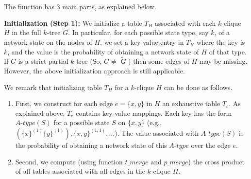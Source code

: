 The function has 3 main parts, as explained below.

\textbf{Initialization (Step 1):} We initialize a table $T_H$ associated with each $k$-clique $H$ in the full $k$-tree $\tilde{G}$. In particular, for each possible state type, say $k$, of a network state on the nodes of $H$, we set a key-value entry in $T_H$ where the key is $k$, and the value is the probability of obtaining a network state of $H$ of that type. If $G$ is a strict partial $k$-tree (So, $G \neq$ $\tilde{G}$ ) then some edges of $H$ may be missing. However, the above initialization approach is still applicable.

We remark that initializing table $T_H$ for a $k$-clique $H$ can be done as follows.
\begin{enumerate}
\item First, we construct for each edge $e=\{x,y\}$ in $H$ an exhaustive table $T_e$. As explained above, $T_e$ contains key-value mappings. Each key has the form $A\mbox{-}type(S)$ for a possible state $S$ on $\{x,y\}$ (e.g., $(\{x\}^{(1)} \{y\}^{(1)}), \{x,y\}^{(1,1)}, \ldots$). The value associated with $A\mbox{-}type(S)$ is the probability of obtaining a network state of this $A\mbox{-}type$ over the edge $e$.
\item Second, we compute (using function $t\_merge \mbox{ and }p\_merge$) the cross product of all tables associated with all edges in the $k$-clique $H$.
\end{enumerate}

